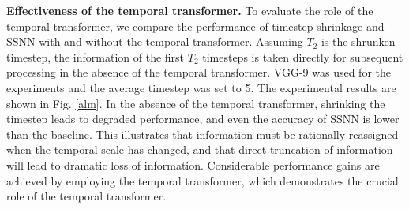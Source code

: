 \documentclass[letterpaper]{article} %
\begin{document}
\textbf{Effectiveness of the temporal transformer.} To evaluate the role of the temporal transformer, we compare the performance of timestep shrinkage and SSNN with and without the temporal transformer. Assuming $T_2$ is the shrunken timestep, the information of the first $T_2$ timesteps is taken directly for subsequent processing in the absence of the temporal transformer. VGG-9 was used for the experiments and the average timestep was set to 5. The experimental results are shown in Fig. \ref{alm}. In the absence of the temporal transformer, shrinking the timestep leads to degraded performance, and even the accuracy of SSNN is lower than the baseline. This illustrates that information must be rationally reassigned when the temporal scale has changed, and that direct truncation of information will lead to dramatic loss of information. Considerable performance gains are achieved by employing the temporal transformer, which demonstrates the crucial role of the temporal transformer.
\end{document}
